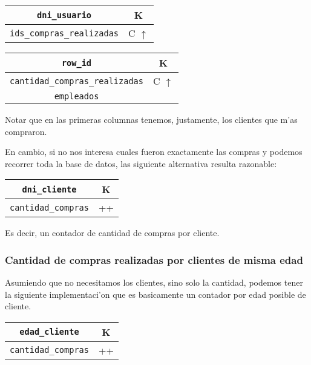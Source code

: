 \begin{center}
\begin{tabular}{|c|c|}
\hline
\texttt{dni\_usuario} & K\\
\hline
\texttt{ids\_compras\_realizadas} & C $\uparrow$\\
\hline
\end{tabular}
\end{center}

\begin{center}
\begin{tabular}{|c|c|}
\hline
\texttt{row\_id} & K\\
\hline
\texttt{cantidad\_compras\_realizadas} & C $\uparrow$\\
\hline
\texttt{empleados} & \\
\hline
\end{tabular}
\end{center}

Notar que en las primeras columnas tenemos, justamente, los clientes que m'as compraron.

En cambio, si no nos interesa cuales fueron exactamente las compras y podemos recorrer toda la base de datos, las siguiente alternativa resulta razonable:

\begin{center}
\begin{tabular}{|c|c|}
\hline
\texttt{dni\_cliente} & K\\
\hline
\texttt{cantidad\_compras} & ++\\
\hline
\end{tabular}
\end{center}

Es decir, un contador de cantidad de compras por cliente.

\subsubsection{Cantidad de compras realizadas por clientes de misma edad}

Asumiendo que no necesitamos los clientes, sino solo la cantidad, podemos tener la siguiente implementaci'on que es basicamente un contador por edad posible de cliente.

\begin{center}
\begin{tabular}{|c|c|}
\hline
\texttt{edad\_cliente} & K\\
\hline
\texttt{cantidad\_compras} & ++\\
\hline
\end{tabular}
\end{center}

